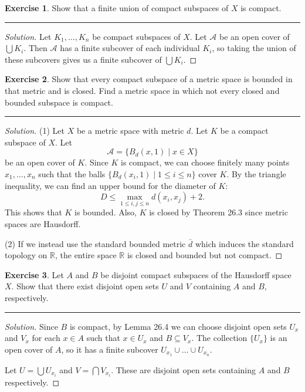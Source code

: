 \documentclass{article}
\theoremstyle{definition}
\newtheorem{exercise}{Exercise}[section]
\begin{document}
\pagebreak

\begin{exercise}
  Show that a finite union of compact subspaces of $X$ is compact.
\end{exercise}
\hrule
\begin{proof}[Solution]
  Let $K_1,\dots,K_n$ be compact subspaces of $X$. Let $\mathcal{A}$ be an open cover of $\bigcup K_i$. Then $\mathcal{A}$ has a finite subcover of each individual $K_i$, so taking the union of these subcovers gives us a finite subcover of $\bigcup K_i$.
\end{proof}

\pagebreak

\begin{exercise}
  Show that every compact subspace of a metric space is bounded in that metric and is closed. Find a metric space in which not every closed and bounded subspace is compact.
\end{exercise}
\hrule
\begin{proof}[Solution]
  (1) Let $X$ be a metric space with metric $d$. Let $K$ be a compact subspace of $X$. Let
  $$\mathcal{A} = \{B_d(x,1)\mid x\in X\}$$
  be an open cover of $K$. Since $K$ is compact, we can choose finitely many points $x_1,\dots,x_n$ such that the balls $\{B_d(x_i,1)\mid 1\le i\le n\}$ cover $K$. By the triangle inequality, we can find an upper bound for the diameter of $K$:
  $$D \le \max_{1\le i,j\le n}d(x_i,x_j) + 2.$$
  This shows that $K$ is bounded. Also, $K$ is closed by Theorem 26.3 since metric spaces are Hausdorff.

  (2) If we instead use the standard bounded metric $\bar{d}$ which induces the standard topology on $\mathbb{R}$, the entire space $\mathbb{R}$ is closed and bounded but not compact.
\end{proof}

\pagebreak

\begin{exercise}
  Let $A$ and $B$ be disjoint compact subspaces of the Hausdorff space $X$. Show that there exist disjoint open sets $U$ and $V$ containing $A$ and $B$, respectively.
\end{exercise}
\hrule
\begin{proof}[Solution]
  Since $B$ is compact, by Lemma 26.4 we can choose disjoint open sets $U_x$ and $V_x$ for each $x\in A$ such that $x\in U_x$ and $B\subseteq V_x$. The collection $\{U_x\}$ is an open cover of $A$, so it has a finite subcover $U_{x_1}\cup\dots\cup U_{x_n}$.

  Let $U = \bigcup U_{x_i}$ and $V = \bigcap V_{x_i}$. These are disjoint open sets containing $A$ and $B$ respectively.
\end{proof}
\end{document}
